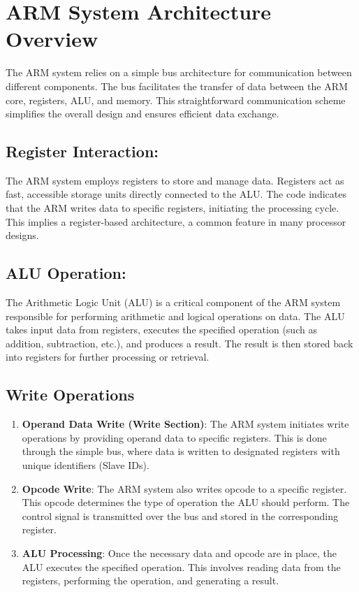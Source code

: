 \documentclass[a4paper,12pt,english]{report}
\begin{document}
\section{ARM System Architecture Overview}


The ARM system relies on a simple bus architecture for communication between different components. The bus facilitates the transfer of data between the ARM core, registers, ALU, and memory. This straightforward communication scheme simplifies the overall design and ensures efficient data exchange.
\subsection{ Register Interaction:}
 The ARM system employs registers to store and manage data. Registers act as fast, accessible storage units directly connected to the ALU. The code indicates that the ARM writes data to specific registers, initiating the processing cycle. This implies a register-based architecture, a common feature in many processor designs.
 \subsection{ALU Operation:}
 The Arithmetic Logic Unit (ALU) is a critical component of the ARM system responsible for performing arithmetic and logical operations on data. The ALU takes input data from registers, executes the specified operation (such as addition, subtraction, etc.), and produces a result. The result is then stored back into registers for further processing or retrieval.

\subsection{Write Operations}

\begin{enumerate}
    \item \textbf{Operand Data Write (Write Section)}: The ARM system initiates write operations by providing operand data to specific registers. This is done through the simple bus, where data is written to designated registers with unique identifiers (Slave IDs).


   \item\textbf{Opcode Write}: The ARM system also writes opcode to a specific register. This opcode determines the type of operation the ALU should perform. The control signal is transmitted over the bus and stored in the corresponding register.

   \item\textbf{ALU Processing}: Once the necessary data and opcode are in place, the ALU executes the specified operation. This involves reading data from the registers, performing the operation, and generating a result.
\end{enumerate}
\end{document}
